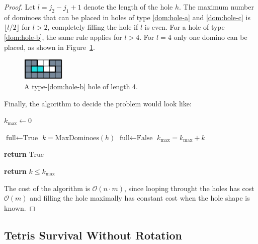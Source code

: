 \begin{proof}
Let \( l = j_2 - j_1 + 1 \) denote the length of the hole \( h \). The maximum number of dominoes that can be placed in holes of type \ref{dom:hole-a} and \ref{dom:hole-c} is \( \lfloor l / 2 \rfloor \) for $l > 2 $, completely filling the hole if \( l \) is even. For a hole of type \ref{dom:hole-b}, the same rule applies for \( l > 4 \). For $l = 4$ only one domino can be placed, as shown in Figure~\ref{dom:hole-4}.

\begin{figure}[h]
    \centering
    \includegraphics[width=0.18\textwidth]{./pictures/dominoes/hole-4.pdf}
    \caption{A type-\ref{dom:hole-b} hole of length 4.}
    \label{dom:hole-4} 
\end{figure}

Finally, the algorithm to decide the problem would look like:
\begin{algorithmic}[1]
     
    \State $k_{\max}\gets 0$ 

    \State $\text{full} \gets \text{True}$
        \State $k = \text{MaxDominoes}(h)$ 
          \State $\text{full} \gets \text{False}$
        \EndIf
        \State $k_{\max} = k_{\max} + k$
      \EndFor

        \State \textbf{return} $\text{True}$ 
    \EndIf
\EndFor

\State \textbf{return} $k \leq k_{\max}$
\EndFunction
\end{algorithmic}

The cost of the algorithm is $\mathcal{O}(n \cdot m)$, since looping throught the holes has cost $\mathcal{O}(m)$ and filling the hole maximally has constant cost when the hole shape is known.

\end{proof}


\subsection{Tetris Survival Without Rotation}

